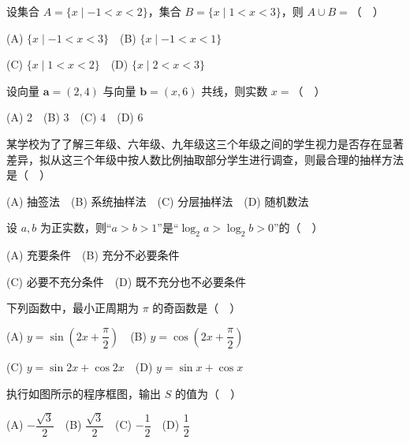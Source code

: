 

\begin{question}
设集合 \(A=\{x\mid -1<x<2\}\)，集合 \(B=\{x\mid 1<x<3\}\)，则 \(A\cup B=\)（　）

(A) \(\{x\mid -1<x<3\}\)　(B) \(\{x\mid -1<x<1\}\)

(C) \(\{x\mid 1<x<2\}\)　(D) \(\{x\mid 2<x<3\}\)

\end{question}
\begin{question}
设向量 \(\boldsymbol{a}=(2,4)\) 与向量 \(\boldsymbol{b}=(x,6)\) 共线，则实数 \(x=\)（　）

(A) 2　(B) 3　(C) 4　(D) 6

\end{question}
\begin{question}
某学校为了了解三年级、六年级、九年级这三个年级之间的学生视力是否存在显著差异，拟从这三个年级中按人数比例抽取部分学生进行调查，则最合理的抽样方法是（　）

(A) 抽签法　(B) 系统抽样法　(C) 分层抽样法　(D) 随机数法

\end{question}
\begin{question}
设 \(a,b\) 为正实数，则“\(a>b>1\)”是“\(\log_2 a>\log_2 b>0\)”的（　）

(A) 充要条件　(B) 充分不必要条件

(C) 必要不充分条件　(D) 既不充分也不必要条件

\end{question}
\begin{question}
下列函数中，最小正周期为 \(\pi\) 的奇函数是（　）

(A) \(y=\sin\left(2x+\dfrac{\pi}{2}\right)\)　(B) \(y=\cos\left(2x+\dfrac{\pi}{2}\right)\)

(C) \(y=\sin 2x+\cos 2x\)　(D) \(y=\sin x+\cos x\)

\Needspace{0.4\textheight}
\end{question}
\begin{question}
执行如图所示的程序框图，输出 \(S\) 的值为（　）
\nopagebreak[4]
\begin{center}\end{center}
\nopagebreak[4]
(A) \(-\dfrac{\sqrt{3}}{2}\)　(B) \(\dfrac{\sqrt{3}}{2}\)　(C) \(-\dfrac{1}{2}\)　(D) \(\dfrac{1}{2}\)

\end{question}
